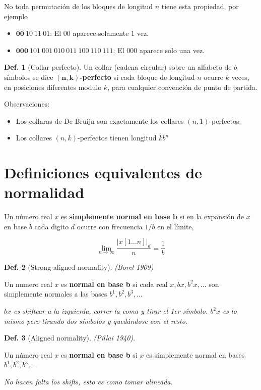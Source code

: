 \documentclass{report}
\theoremstyle{definition} %
\newtheorem{definition}{Def.}[chapter]
\begin{document}
No toda permutación de los bloques de longitud $n$ tiene esta propiedad, por ejemplo

\begin{itemize}
    \item $\bm{00}\ 10\ 11\ 01$: El $00$ aparece solamente 1 vez.
    \item $\bm{000}\ 101\ 001\ 010\ 011\ 100\ 110\ 111$: El $000$ aparece solo una vez.
\end{itemize}

\begin{definition}[Collar perfecto]
    Un collar (cadena circular) sobre un alfabeto de $b$ símbolos se dice
    $\bm{(n, k)}$\textbf{-perfecto} si cada bloque de longitud $n$ ocurre $k$
    veces, en posiciones diferentes modulo $k$, para cualquier convención de
    punto de partida.
\end{definition}

Observaciones:

\begin{itemize}
    \item Los collaras de De Bruijn son exactamente los collares $(n, 1)$-perfectos.
    \item Los collares $(n, k)$-perfectos tienen longitud $k b^n$
\end{itemize}

\section{Definiciones equivalentes de normalidad}

Un número real $x$ es \textbf{simplemente normal en base b} si en la expansión
de $x$ en base $b$ cada digito $d$ ocurre con frecuencia $1/b$ en el límite,

$$\lim_{n\to\infty} \frac{|x[1\dots n]|_d}{n} = \frac{1}{b}$$

\begin{definition}[Strong aligned normality]\label{def:norm-strong-aligned}
    \textit{(Borel 1909)}
    
    Un numero real $x$ es \textbf{normal en base b} si cada real $x, bx, b^2 x,
    \dots$ son simplemente normales a las bases $b^1, b^2, b^3, \dots$

    \textit{$bx$ es shiftear a la izquierda, correr la coma y tirar el 1er símbolo. $b^2x$ es lo mismo pero tirando dos símbolos y quedándose con el resto.}
\end{definition}

\begin{definition}[Aligned normality]\label{def:norm-aligned}
    \textit{(Pillai 1940)}.
    
    Un número real $x$ es \textbf{normal en base b} si $x$ es simplemente normal en bases $b^1, b^2, b^3, \dots$

    \textit{No hacen falta los shifts, esto es como tomar alineada.}
\end{definition}
\end{document}
